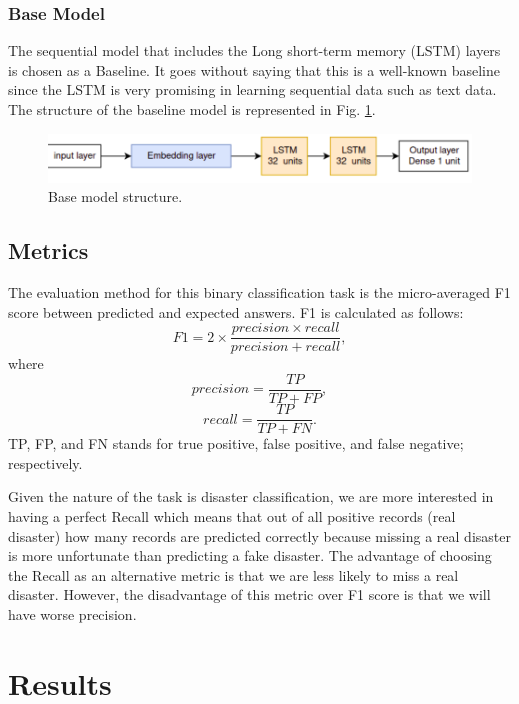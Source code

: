\documentclass[sigconf]{acmart}
\begin{document}
\subsubsection{Base Model}
The sequential model that includes the Long short-term memory (LSTM) layers is chosen as a Baseline. It goes without saying that this is a well-known baseline since the LSTM is very promising in learning sequential data such as text data. The structure of the baseline model is represented in Fig. \ref{fig:basemodel}.
\begin{figure}[h]
  \centering
  \includegraphics[width=\linewidth]{basemodel.png}
  \caption{Base model structure.}
  \label{fig:basemodel}
\end{figure}

\subsection{Metrics}
The evaluation method for this binary classification task is the micro-averaged F1 score between predicted and expected answers. F1 is calculated as follows: 
\begin{equation}
  F1 = 2\times \frac{precision\times recall}{precision+recall},
\end{equation}
where 
\begin{equation}
  precision = \frac{TP}{TP+FP},
\end{equation}
\begin{equation}
  recall = \frac{TP}{TP+FN}.
\end{equation}
TP, FP, and FN stands for true positive, false positive, and false negative; respectively.

Given the nature of the task is disaster classification, we are more interested in having a perfect Recall which means that out of all positive records (real disaster) how many records are predicted correctly because missing a real disaster is more unfortunate than predicting a fake disaster. The advantage of choosing the Recall as an alternative metric is that we are less likely to miss a real disaster. However, the disadvantage of this metric over F1 score is that we will have worse precision. 

\section{Results}
\end{document}
